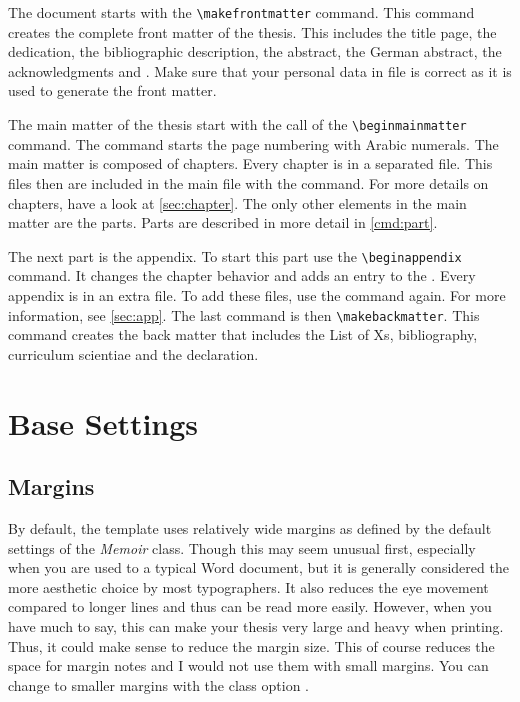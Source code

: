 The document starts with the \verb!\makefrontmatter! command. This command
creates the complete front matter of the thesis. This includes the title page,
the dedication, the bibliographic description, the abstract, the German
abstract, the acknowledgments and . Make sure that your personal data
in file  is correct as it is used to generate the
front matter.

The main matter of the thesis start with the call of the
\verb|\beginmainmatter| command. The command starts the page numbering with
Arabic numerals. The main matter is composed of chapters. Every chapter is in
a separated file. This files then are included in the main file with the
\verb|| command. For more details on chapters, have a look at
\autoref{sec:chapter}. The only other elements in the main matter are the
parts.  Parts are described in more detail in \autoref{cmd:part}.

The next part is the appendix. To start this part use the
\verb|\beginappendix| command. It changes the chapter behavior and adds an
entry to the .  Every appendix is in an extra file. To add these
files, use the \verb|| command again. For more information, see
\autoref{sec:app}. The last command is then \verb|\makebackmatter|. This
command creates the back matter that includes the List of Xs, bibliography,
curriculum scientiae and the declaration.

\section{Base Settings}
\subsection{Margins}%
\label{opt:margins}

By default, the template uses relatively wide margins as defined by the
default settings of the \emph{Memoir} class. Though this may seem unusual
first, especially when you are used to a typical Word document, but it is
generally considered the more aesthetic choice by most typographers. It also
reduces the eye movement  compared to longer lines and thus can be read more
easily. However, when you have much to say, this can make your thesis very
large and heavy when printing. Thus, it could make sense to reduce the margin
size. This of course reduces the space for margin notes and I would not use
them with small margins. You can change to smaller margins with the class
option .

